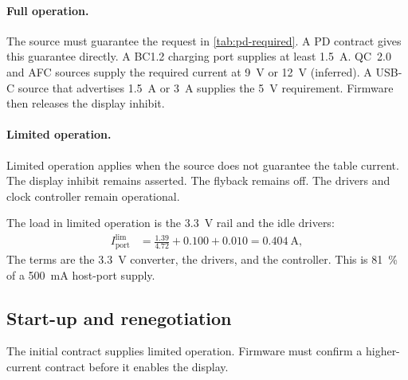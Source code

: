 \paragraph{Full operation.} The source must guarantee the request in
\cref{tab:pd-required}. A PD contract gives this guarantee directly. A BC1.2
charging port supplies at least \SI{1.5}{\ampere}. QC~2.0 and AFC sources
supply the required current at \SI{9}{\volt} or \SI{12}{\volt} (inferred).
A USB-C source that advertises \SI{1.5}{\ampere} or \SI{3}{\ampere} supplies
the \SI{5}{\volt} requirement. Firmware then releases the display inhibit.

\paragraph{Limited operation.} Limited operation applies when the source does
not guarantee the table current. The display inhibit remains asserted. The
flyback remains off. The drivers and clock controller remain operational.

The load in limited operation is the 3.3~V rail and the idle drivers:
\begin{align*}
  I_{\mathrm{port}}^{\mathrm{lim}} &= \frac{1.39}{4.72} + 0.100 + 0.010
    = \SI{0.404}{\ampere},
\end{align*}
The terms are the 3.3~V converter, the drivers, and the controller. This is
\SI{81}{\percent} of a \SI{500}{\milli\ampere} host-port supply.

\subsection{Start-up and renegotiation}\label{sec:pd-sequence}

The initial contract supplies limited operation. Firmware must confirm a
higher-current contract before it enables the display.

